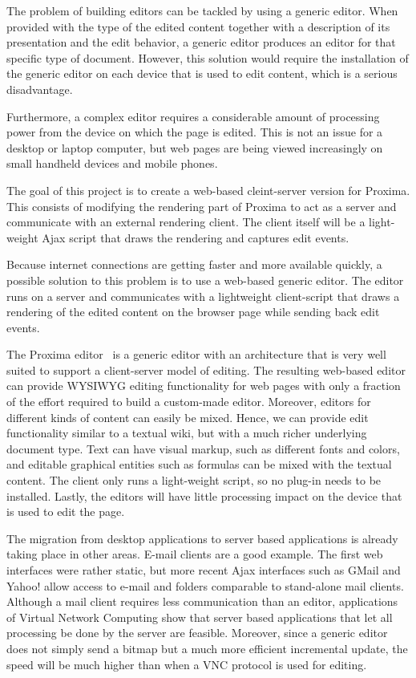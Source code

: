 \documentclass[10pt]{article}
\begin{document}
The problem of building  editors can be tackled by using a generic editor. When provided with the type of the edited content together with a description of its presentation and the edit behavior, a generic editor produces an editor for that specific type of document. However, this solution would require the installation of the generic editor on each device that is used to edit content, which is a serious disadvantage. 


\bc
Furthermore, a complex editor requires a considerable amount of processing power from the device on which the page is edited. This is not an issue for a desktop or laptop computer, but web pages are being viewed increasingly on small handheld devices and mobile phones. 
\ec

\bc
The goal of this project is to create a web-based cleint-server version for Proxima. This consists of modifying the rendering part of Proxima to act as a server and communicate with an external rendering client. The client itself will be  a light-weight Ajax script that draws the rendering and captures edit events.  
\ec

Because internet connections are getting faster and more available quickly, a possible solution to this problem is to use a web-based generic editor. The editor runs on a server and communicates with a lightweight client-script that draws a rendering of the edited content on the browser page while sending back edit events. 

The Proxima editor~\cite{schrage08proximaHome, schrage04proxima} is a generic editor with an architecture that is very well suited to support a client-server model of editing. The resulting web-based editor can provide WYSIWYG editing functionality for web pages with only a fraction of the effort required to build a custom-made editor. Moreover, editors for different kinds of content can easily be mixed. Hence, we can provide edit functionality similar to a textual wiki, but with a much richer underlying document type. Text can have visual markup, such as different fonts and colors, and editable graphical entities such as formulas can be mixed with the textual content. The client only runs a light-weight script, so no plug-in needs to be installed. Lastly, the editors will have little processing impact on the device that is used to edit the page.


The migration from desktop applications to server based applications is already taking place in other areas. E-mail clients are a good example. The first web interfaces were rather static, but more recent Ajax interfaces such as GMail and Yahoo! allow access to e-mail and folders comparable to stand-alone mail clients. Although a mail client requires less communication than an editor, applications of Virtual Network Computing show that server based applications that let all processing be done by the server are feasible. Moreover, since a generic editor does not simply send a bitmap but a much more efficient incremental update, the speed will be much higher than when a VNC protocol is used for editing. 
\end{document}
